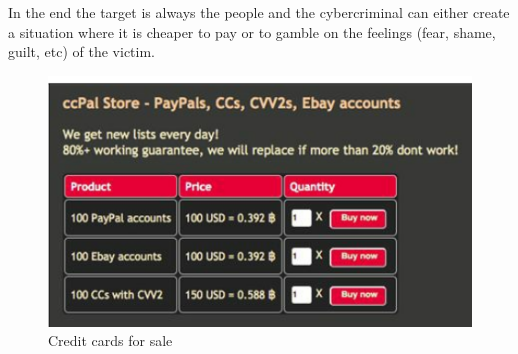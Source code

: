 \linej
In the end the target is always the people and the cybercriminal can either create a situation where it is cheaper to pay or to gamble on the feelings (fear, shame, guilt, etc) of the victim.
\begin{figure}[H]
	\centering
	\includegraphics[width=.7\textwidth]{figuras/credit_cards_for_sale.png}
	\caption{Credit cards for sale\cite{ransomware_digital_extortion}}
\end{figure}


